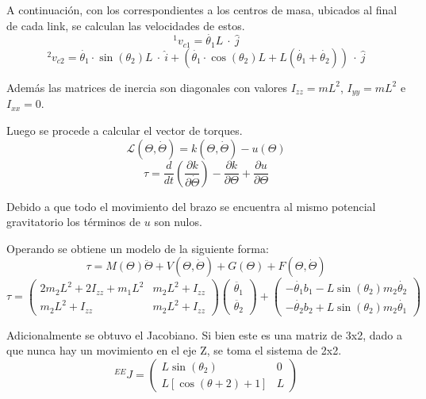 A continuación, con los correspondientes a los centros de masa, ubicados al final de cada link, se calculan las velocidades de estos.
\begin{equation*}
^1v_{c1}=\dot{\theta_1}L \ \cdot \  \hat{j}
\end{equation*}
\begin{equation*}
^2v_{c2}=\dot{\theta_1} \cdot \sin(\theta_2)L  \ \cdot \ \hat{i} + \left( \dot{\theta_1} \cdot \cos(\theta_2)L  + L( \dot{\theta_1}+\dot{\theta_2} ) \right) \ \cdot \  \hat{j}
\end{equation*}

Además las matrices de inercia son diagonales con valores $I_{zz}=mL^2$, $I_{yy}=mL^2$ e $I_{xx}=0$.

Luego se procede a calcular el vector de torques.
\begin{equation}
\mathcal{L}(\Theta , \dot{\Theta}) = k(\Theta , \dot{\Theta}) - u(\Theta)
\end{equation}
\begin{equation*}
\tau = \frac{d}{dt}\left(\frac{\partial k}{\partial \dot{\Theta}} \right) - \frac{\partial k}{\partial \Theta} + \frac{\partial u}{\partial \Theta}
\end{equation*}

Debido a que todo el movimiento del brazo se encuentra al mismo potencial gravitatorio los términos de $u$ son nulos.

Operando se obtiene un modelo de la siguiente forma:
\begin{equation*}
\tau =  M(\Theta) \ddot{\Theta} + V(\Theta , \dot{\Theta}) + G(\Theta) + F(\Theta , \dot{\Theta})
\end{equation*}
\begin{equation}
\tau = \begin{pmatrix}
2m_2L^2+2I_{zz}+m_1L^2 & m_2L^2+I_{zz}\\
m_2L^2+I_{zz} & m_2L^2+I_{zz}
\end{pmatrix} 
\begin{pmatrix}
\ddot{\theta_1} \\ 
\ddot{\theta_2}
\end{pmatrix}
+
\begin{pmatrix}
-\dot{\theta_1}b_1-L\sin(\theta_2)m_2\dot{\theta_2} \\ 
-\dot{\theta_2}b_2+L\sin(\theta_2)m_2\dot{\theta_1}
\end{pmatrix}
\end{equation}

Adicionalmente se obtuvo el Jacobiano. Si bien este es una matriz de 3x2, dado a que nunca hay un movimiento en el eje Z, se toma el sistema de 2x2.
\begin{equation}
^{EE}J=\begin{pmatrix}
L\sin(\theta_2) & 0 \\
L\left[\cos(\theta+2)+1\right] & L
\end{pmatrix}
\end{equation}
%